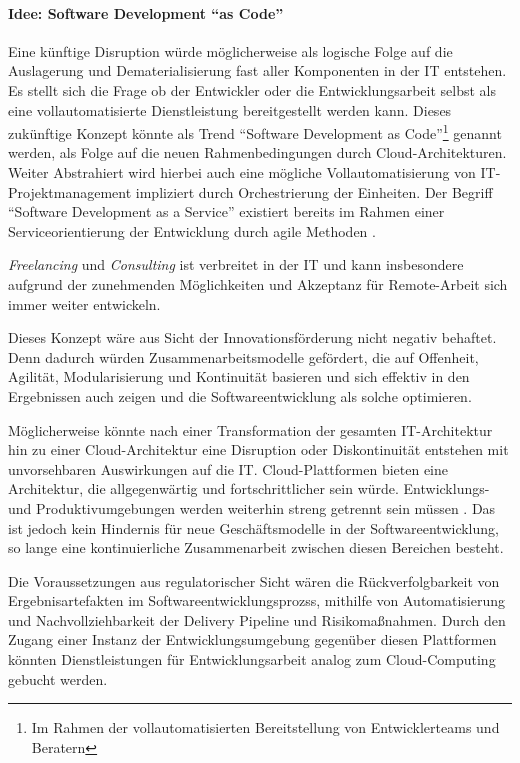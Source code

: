 \paragraph{Idee: Software Development \enquote{as Code}}
\label{Disruption:DaaS}
Eine künftige Disruption würde möglicherweise als logische Folge auf die Auslagerung und Dematerialisierung fast aller Komponenten in der IT entstehen.
Es stellt sich die Frage ob der Entwickler oder die Entwicklungsarbeit selbst als eine vollautomatisierte Dienstleistung bereitgestellt werden kann. Dieses zukünftige Konzept könnte als Trend \enquote{Software Development as Code}\footnote{Im Rahmen der vollautomatisierten Bereitstellung von Entwicklerteams und Beratern} genannt werden, als Folge auf die neuen Rahmenbedingungen durch Cloud-Architekturen. Weiter Abstrahiert wird hierbei auch eine mögliche Vollautomatisierung von IT-Projektmanagement impliziert durch Orchestrierung der Einheiten.
Der Begriff \enquote{Software Development as a Service} existiert bereits im Rahmen einer Serviceorientierung der Entwicklung durch agile Methoden \cite{Lehman:2011}.

\emph{Freelancing} und \emph{Consulting} ist verbreitet in der IT und kann insbesondere aufgrund der zunehmenden Möglichkeiten und Akzeptanz für Remote-Arbeit sich immer weiter entwickeln. 

Dieses Konzept wäre aus Sicht der Innovationsförderung nicht negativ behaftet. Denn dadurch würden Zusammenarbeitsmodelle gefördert, die auf Offenheit, Agilität, Modularisierung und Kontinuität basieren und sich effektiv in den Ergebnissen auch zeigen und die Softwareentwicklung als solche optimieren.

Möglicherweise könnte nach einer Transformation der gesamten IT-Architektur hin zu einer Cloud-Architektur eine Disruption oder Diskontinuität entstehen mit unvorsehbaren Auswirkungen auf die IT. Cloud-Plattformen bieten eine Architektur, die allgegenwärtig und fortschrittlicher sein würde. Entwicklungs- und Produktivumgebungen werden weiterhin streng getrennt sein müssen \cite{MaRisk:2017}. Das ist jedoch kein Hindernis für neue Geschäftsmodelle in der Softwareentwicklung, so lange eine kontinuierliche Zusammenarbeit zwischen diesen Bereichen besteht.

Die Voraussetzungen aus regulatorischer Sicht wären die Rückverfolgbarkeit von Ergebnisartefakten im Softwareentwicklungsprozss, mithilfe von Automatisierung und Nachvollziehbarkeit der Delivery Pipeline und Risikomaßnahmen. Durch den Zugang einer Instanz der Entwicklungsumgebung gegenüber diesen Plattformen könnten Dienstleistungen für Entwicklungsarbeit analog zum Cloud-Computing gebucht werden.

